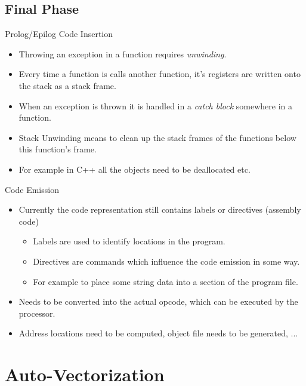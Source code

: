 \documentclass[]{beamer}
\begin{document}
\subsection{Final Phase}
\begin{frame}{Prolog/Epilog Code Insertion}

\begin{itemize}
  \item Throwing an exception in a function requires \textit{unwinding}.
  \item Every time a function is calls another function, it's registers are written onto the stack as a stack frame.
  \item When an exception is thrown it is handled in a \textit{catch block} somewhere in a function.
  \item Stack Unwinding means to clean up the stack frames of the functions below this function's frame.
  \item For example in C++ all the objects need to be deallocated etc.
\end{itemize}

\end{frame}

\begin{frame}{Code Emission}

\begin{itemize}
  \item Currently the code representation still contains labels or directives (assembly code)
  \begin{itemize}
    \item Labels are used to identify locations in the program.
    \item Directives are commands which influence the code emission in some way.
    \item For example to place some string data into a section of the program file.
  \end{itemize}
  \item Needs to be converted into the actual opcode, which can be executed by the processor.
  \item Address locations need to be computed, object file needs to be generated, ...
\end{itemize}

\end{frame}


\section{Auto-Vectorization}
\end{document}
